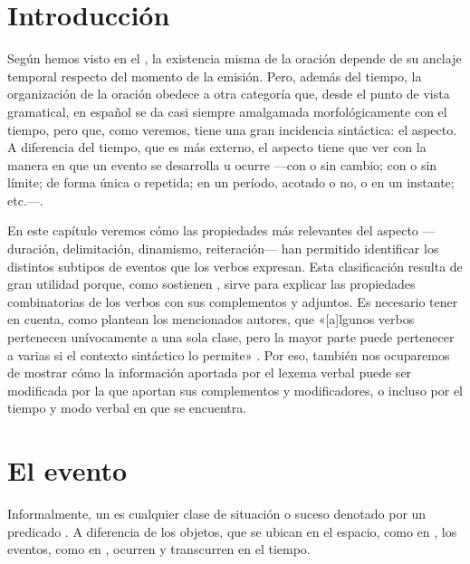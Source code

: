 
\section{Introducción}

Según hemos visto en el , la existencia misma de la oración depende de
su anclaje temporal respecto del momento de la emisión. Pero, además del tiempo,
la organización de la oración obedece a otra categoría que, desde el punto de
vista gramatical, en español se da casi siempre amalgamada morfológicamente con
el tiempo, pero que, como veremos, tiene una gran incidencia sintáctica: el
aspecto. A diferencia del tiempo, que es más externo, el aspecto tiene que ver
con la manera en que un evento se desarrolla u ocurre ---con o sin cambio; con o
sin límite; de forma única o repetida; en un período, acotado o no, o en un
instante; etc.---.

En este capítulo veremos cómo las propiedades más relevantes del aspecto
---duración, delimitación, dinamismo, reiteración--- han permitido identificar
los distintos subtipos de eventos que los verbos expresan. Esta clasificación
resulta de gran utilidad porque, como sostienen \textcite{bosque2009}, sirve
para explicar las propiedades combinatorias de los verbos con sus complementos
y adjuntos. Es necesario tener en cuenta, como plantean los mencionados autores,
que «[a]lgunos verbos pertenecen unívocamente a una sola clase, pero la mayor
parte puede pertenecer a varias si el contexto sintáctico lo permite»
\parencite[307]{bosque2009}. Por eso, también nos ocuparemos de mostrar cómo la
información aportada por el lexema verbal puede ser modificada por la que
aportan sus complementos y modificadores, o incluso por el tiempo y modo verbal
en que se encuentra.

\section{El evento}\label{sec:08-evento}

Informalmente, un  es cualquier clase de situación o suceso
denotado por un predicado \parencite[158]{pustejovsky2019}. A diferencia de los
objetos, que se ubican en el espacio, como  en
, los eventos, como  en ,
ocurren y transcurren en el tiempo.

